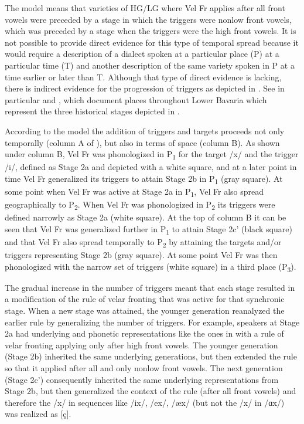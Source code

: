 The  model means that varieties of HG/LG where Vel Fr applies after all front vowels were preceded by a stage in which the triggers were nonlow front vowels, which was preceded by a stage when the triggers were the high front vowels. It is not possible to provide direct evidence for this type of temporal spread because it would require a description of a dialect spoken at a particular place (P) at a particular time (T) and another description of the same variety spoken in P at a time earlier or later than T. Although that type of direct evidence is lacking, there is indirect evidence for the progression of triggers as depicted in . See in particular  and , which document places throughout Lower Bavaria which represent the three historical stages depicted in .

According to the  model the addition of triggers and targets proceeds not only temporally (column A of ), but also in terms of space (column B). As shown under column B, Vel Fr was phonologized in P\textsubscript{1} for the target /x/ and the trigger /i/, defined as Stage 2a and depicted with a white square, and at a later point in time Vel Fr generalized its triggers to attain Stage 2b in P\textsubscript{1} (gray square). At some point when Vel Fr was active at Stage 2a in P\textsubscript{1}, Vel Fr also spread geographically to P\textsubscript{2}. When Vel Fr was phonologized in P\textsubscript{2} its triggers were defined narrowly as Stage 2a (white square). At the top of column B it can be seen that Vel Fr was generalized further in P\textsubscript{1} to attain Stage 2c' (black square) and that Vel Fr also spread temporally to P\textsubscript{2} by attaining the targets and/or triggers representing Stage 2b (gray square). At some point Vel Fr was then phonologized with the narrow set of triggers (white square) in a third place (P\textsubscript{3}).

The gradual increase in the number of triggers meant that each stage resulted in a modification of the rule of velar fronting that was active for that synchronic stage. When a new stage was attained, the younger generation reanalyzed the earlier rule by generalizing the number of triggers. For example, speakers at Stage 2a had underlying and phonetic representations like the ones in  with a rule of velar fronting applying only after high front vowels. The younger generation (Stage 2b) inherited the same underlying generations, but then extended the rule so that it applied after all and only nonlow front vowels. The next generation (Stage 2c') consequently inherited the same underlying representations from Stage 2b, but then generalized the context of the rule (after all front vowels) and therefore the /x/ in sequences like /ix/, /ex/, /æx/ (but not the /x/ in /ɑx/) was realized as [ç].

